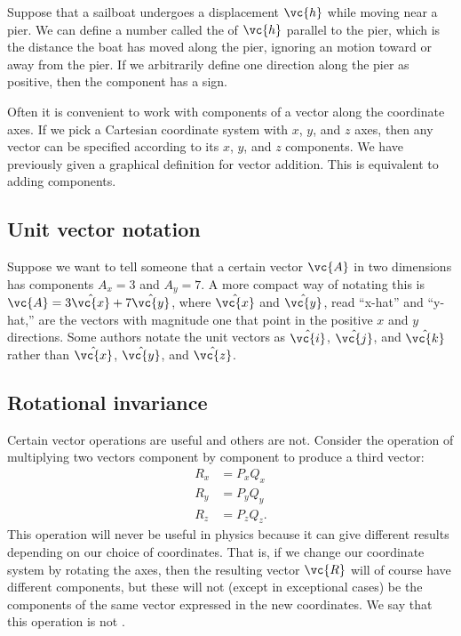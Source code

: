 Suppose that a sailboat undergoes a displacement $\vc{h}$ while moving near
a pier.
We can define a number called the  of $\vc{h}$ parallel to
the pier, which is the distance the boat has moved along the pier, ignoring
an motion toward or away from the pier. If we arbitrarily define one direction
along the pier as positive, then the component has a sign. 

Often it is convenient to work with components of a vector along the coordinate axes.
If we pick a Cartesian coordinate system
with $x$, $y$, and $z$ axes, then any vector can be specified according to its
$x$, $y$, and $z$ components. We have previously given a graphical definition for
vector addition. This is equivalent to adding components.

\subsection{Unit vector notation}
Suppose we want to tell someone that a certain vector $\vc{A}$ in two dimensions
has components $A_x=3$ and $A_y=7$. A more compact way of notating this is
$\vc{A}=3\hat{\vc{x}}+7\hat{\vc{y}}$, where $\hat{\vc{x}}$ and $\hat{\vc{y}}$, read ``x-hat'' and ``y-hat,''
are the vectors with magnitude one that point in the positive $x$ and $y$
directions. Some authors notate the unit vectors as $\hat{\vc{i}}$, $\hat{\vc{j}}$, and $\hat{\vc{k}}$
rather than $\hat{\vc{x}}$, $\hat{\vc{y}}$, and $\hat{\vc{z}}$.

\subsection{Rotational invariance}

Certain vector operations
are useful and others are not. Consider the operation of
multiplying two vectors component by component to produce a third vector:
\begin{align*}
        R_x    &=    P_x Q_x  \\
        R_y    &=    P_y Q_y  \\
        R_z    &=    P_z Q_z.
\end{align*}
This operation will never be useful in physics because it can give different
results depending on our choice of coordinates. That is, if we change our coordinate
system by rotating the axes, then the resulting vector
$\vc{R}$ will of course have different components, but these will not (except in exceptional cases)
be the components of the same vector expressed in the new coordinates. We say that this
operation is not .

